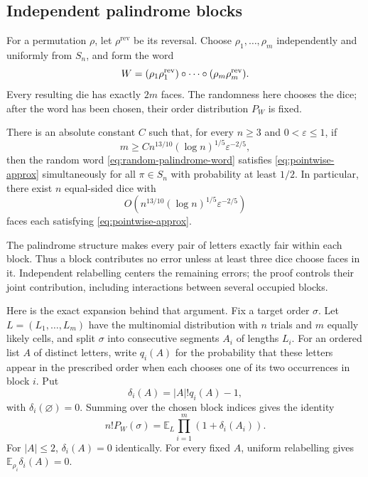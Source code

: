 \subsection{Independent palindrome blocks}

For a permutation $\rho$, let $\rho^{\mathrm{rev}}$ be its reversal.
Choose $\rho_1,\ldots,\rho_m$ independently and uniformly from $S_n$, and
form the word
\begin{equation}\label{eq:random-palindrome-word}
  W=(\rho_1\rho_1^{\mathrm{rev}})
       \mathbin{\circ}\cdots\mathbin{\circ}(\rho_m\rho_m^{\mathrm{rev}}).
\end{equation}
Every resulting die has exactly $2m$ faces.  The randomness here chooses
the dice; after the word has been chosen, their order distribution $P_W$
is fixed.

\begin{theorem}
\label{thm:approximate}
There is an absolute constant $C$ such that, for every $n\geq3$ and
$0<\varepsilon\leq1$, if
\[
  m\geq Cn^{13/10}(\log n)^{1/5}\varepsilon^{-2/5},
\]
then the random word \eqref{eq:random-palindrome-word} satisfies
\eqref{eq:pointwise-approx} simultaneously for all $\pi\in S_n$ with
probability at least $1/2$.  In particular, there exist $n$ equal-sided
dice with
\[
  O\!\left(n^{13/10}(\log n)^{1/5}\varepsilon^{-2/5}\right)
\]
faces each satisfying \eqref{eq:pointwise-approx}.
\end{theorem}

The palindrome structure makes every pair of letters exactly fair within
each block.  Thus a block contributes no error unless at least three dice
choose faces in it.  Independent relabelling centers the remaining errors;
the proof controls their joint contribution, including interactions between
several occupied blocks.

Here is the exact expansion behind that argument.  Fix a target order
$\sigma$.  Let $L=(L_1,\ldots,L_m)$ have the multinomial distribution with
$n$ trials and $m$ equally likely cells, and split $\sigma$ into consecutive
segments $A_i$ of lengths $L_i$.  For an ordered list $A$ of distinct
letters, write $q_i(A)$ for the probability that these letters appear in
the prescribed order when each chooses one of its two occurrences in
block $i$.  Put
\[
  \delta_i(A)=|A|!q_i(A)-1,
\]
with $\delta_i(\varnothing)=0$.  Summing over the chosen block indices gives
the identity
\begin{equation}\label{eq:palindrome-expansion}
  n!P_W(\sigma)=\mathbb E_L\prod_{i=1}^m(1+\delta_i(A_i)).
\end{equation}
For $|A|\leq2$, $\delta_i(A)=0$ identically.  For every fixed $A$,
uniform relabelling gives $\mathbb E_{\rho_i}\delta_i(A)=0$.

